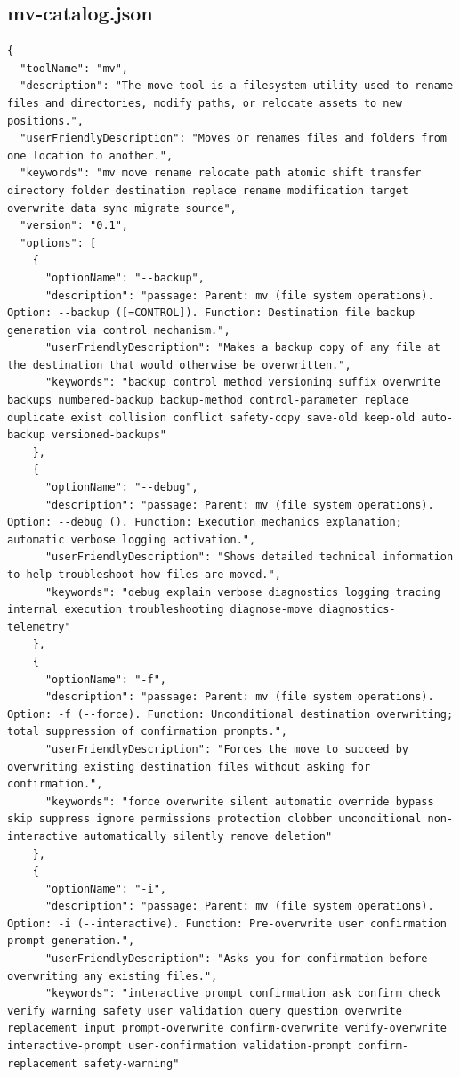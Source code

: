 \begin{appendix}
\subsection{mv-catalog.json}
\begin{lstlisting}
{
  "toolName": "mv",
  "description": "The move tool is a filesystem utility used to rename files and directories, modify paths, or relocate assets to new positions.",
  "userFriendlyDescription": "Moves or renames files and folders from one location to another.",
  "keywords": "mv move rename relocate path atomic shift transfer directory folder destination replace rename modification target overwrite data sync migrate source",
  "version": "0.1",
  "options": [
    {
      "optionName": "--backup",
      "description": "passage: Parent: mv (file system operations). Option: --backup ([=CONTROL]). Function: Destination file backup generation via control mechanism.",
      "userFriendlyDescription": "Makes a backup copy of any file at the destination that would otherwise be overwritten.",
      "keywords": "backup control method versioning suffix overwrite backups numbered-backup backup-method control-parameter replace duplicate exist collision conflict safety-copy save-old keep-old auto-backup versioned-backups"
    },
    {
      "optionName": "--debug",
      "description": "passage: Parent: mv (file system operations). Option: --debug (). Function: Execution mechanics explanation; automatic verbose logging activation.",
      "userFriendlyDescription": "Shows detailed technical information to help troubleshoot how files are moved.",
      "keywords": "debug explain verbose diagnostics logging tracing internal execution troubleshooting diagnose-move diagnostics-telemetry"
    },
    {
      "optionName": "-f",
      "description": "passage: Parent: mv (file system operations). Option: -f (--force). Function: Unconditional destination overwriting; total suppression of confirmation prompts.",
      "userFriendlyDescription": "Forces the move to succeed by overwriting existing destination files without asking for confirmation.",
      "keywords": "force overwrite silent automatic override bypass skip suppress ignore permissions protection clobber unconditional non-interactive automatically silently remove deletion"
    },
    {
      "optionName": "-i",
      "description": "passage: Parent: mv (file system operations). Option: -i (--interactive). Function: Pre-overwrite user confirmation prompt generation.",
      "userFriendlyDescription": "Asks you for confirmation before overwriting any existing files.",
      "keywords": "interactive prompt confirmation ask confirm check verify warning safety user validation query question overwrite replacement input prompt-overwrite confirm-overwrite verify-overwrite interactive-prompt user-confirmation validation-prompt confirm-replacement safety-warning"

\end{lstlisting}
\end{appendix}
